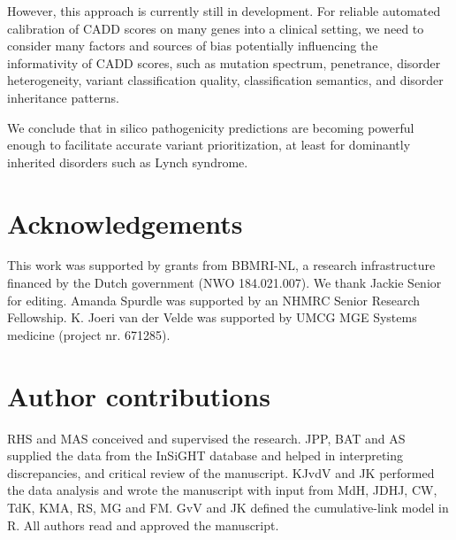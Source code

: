 However, this approach is currently still in development.
For reliable automated calibration of CADD scores on many genes into a clinical setting, we need to consider many factors and sources of bias potentially influencing the informativity of CADD scores, such as mutation spectrum, penetrance, disorder heterogeneity, variant classification quality, classification semantics, and disorder inheritance patterns.

We conclude that in silico pathogenicity predictions are becoming powerful enough to facilitate accurate variant prioritization, at least for dominantly inherited disorders such as Lynch syndrome.

\section*{Acknowledgements}
This work was supported by grants from BBMRI-NL, a research infrastructure financed by the Dutch government (NWO 184.021.007).
We thank Jackie Senior for editing.
Amanda Spurdle was supported by an NHMRC Senior Research Fellowship.
K. Joeri van der Velde was supported by UMCG MGE Systems medicine (project nr. 671285).

\section*{Author contributions}
RHS and MAS conceived and supervised the research.
JPP, BAT and AS supplied the data from the InSiGHT database and helped in interpreting discrepancies, and critical review of the manuscript.
KJvdV and JK performed the data analysis and wrote the manuscript with input from MdH, JDHJ, CW, TdK, KMA, RS, MG and FM.
GvV and JK defined the cumulative-link model in R.
All authors read and approved the manuscript.
